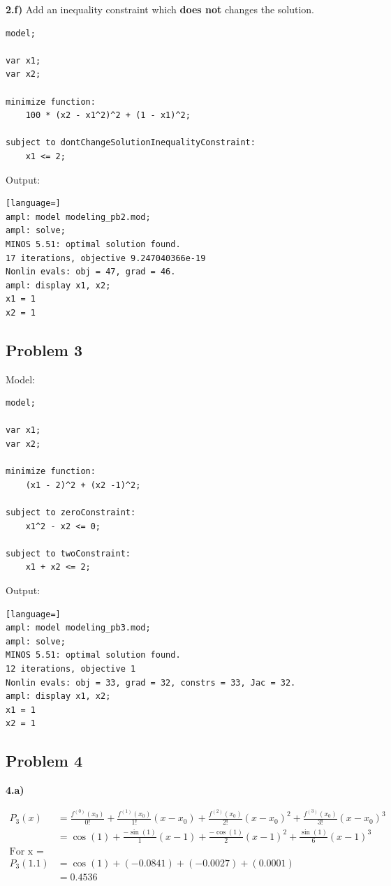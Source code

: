 \textbf{2.f)}  Add an inequality constraint which \textbf{does not} changes the solution.
\begin{lstlisting}
model;

var x1;
var x2;

minimize function:
	100 * (x2 - x1^2)^2 + (1 - x1)^2;
	
subject to dontChangeSolutionInequalityConstraint:
	x1 <= 2;
\end{lstlisting}

Output:

\begin{lstlisting}[language=]
ampl: model modeling_pb2.mod;
ampl: solve;
MINOS 5.51: optimal solution found.
17 iterations, objective 9.247040366e-19
Nonlin evals: obj = 47, grad = 46.
ampl: display x1, x2;
x1 = 1
x2 = 1
\end{lstlisting}

\subsection{Problem 3}

Model:

\begin{lstlisting}
model;

var x1;
var x2;

minimize function:
	(x1 - 2)^2 + (x2 -1)^2;
	
subject to zeroConstraint:
	x1^2 - x2 <= 0;
	
subject to twoConstraint:
	x1 + x2 <= 2;
\end{lstlisting}

Output:

\begin{lstlisting}[language=]
ampl: model modeling_pb3.mod;
ampl: solve;
MINOS 5.51: optimal solution found.
12 iterations, objective 1
Nonlin evals: obj = 33, grad = 32, constrs = 33, Jac = 32.
ampl: display x1, x2;
x1 = 1
x2 = 1
\end{lstlisting}

\subsection{Problem 4}

\textbf{4.a)}

\begin{align*}
P_3(x) &= \frac{f^{(0)}(x_0)}{0!} + \frac{f^{(1)}(x_0)}{1!}(x - x_0) + \frac{f^{(2)}(x_0)}{2!}(x - x_0)^2 + \frac{f^{(3)}(x_0)}{3!}(x - x_0)^3\\
&= \cos(1) + \frac{-\sin(1)}{1} (x-1) + \frac{-\cos(1)}{2} (x - 1)^2 + \frac{\sin(1)}{6}(x-1)^3\\
\text{For x = 1.1 we have}\\
P_3(1.1) &= \cos(1) + (-0.0841) + (-0.0027) + (0.0001)\\
&= 0.4536
\end{align*}

